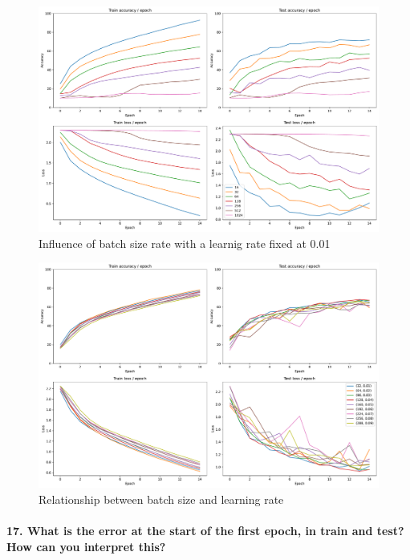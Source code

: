 \documentclass{article}
\theoremstyle{plain}%
\theoremstyle{definition}
\theoremstyle{remark}
\begin{document}
\begin{figure}[H]
    \centering
    \includegraphics*[width=\textwidth]{figs/CNN/batch_size_influence.pdf}
    \caption{Influence of batch size rate with a learnig rate fixed at 0.01}
    \label{fig:batch_size_influence}
\end{figure}

\begin{figure}[H]
    \centering
    \includegraphics*[width=\textwidth]{figs/CNN/linear_scaling.pdf}
    \caption{Relationship between batch size and learning rate}
    \label{fig:linear_scaling}
\end{figure}

\paragraph{17. What is the error at the start of the first epoch, in train and test? How can you interpret this?}
\end{document}
